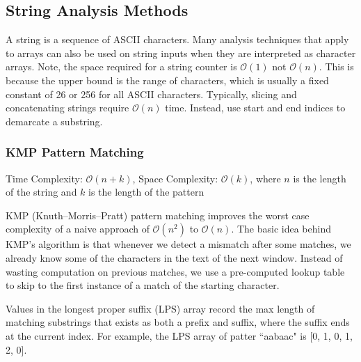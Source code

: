 \documentclass{article}
\newcommand{\bigO}{\mathcal{O}}
\begin{document}
    
    \subsection{String Analysis Methods}
    A string is a sequence of ASCII characters. Many analysis techniques that apply to arrays can also be used on string inputs when they are interpreted as character arrays. Note, the space required for a string counter is $\bigO(1)$ not $\bigO(n)$. This is because the upper bound is the range of characters, which is usually a fixed constant of 26 or 256 for all ASCII characters. Typically, slicing and concatenating strings require $\bigO(n)$ time. Instead, use start and end indices to demarcate a substring.
    
    \subsubsection{KMP Pattern Matching}
    Time Complexity: $\bigO(n + k)$, Space Complexity: $\bigO(k)$, where $n$ is the length of the string and $k$ is the length of the pattern
    
    KMP (Knuth--Morris--Pratt) pattern matching improves the worst case complexity of a naive approach of $\bigO(n^2)$ to $\bigO(n)$. The basic idea behind KMP’s algorithm is that whenever we detect a mismatch after some matches, we already know some of the characters in the text of the next window. Instead of wasting computation on previous matches, we use a pre-computed lookup table to skip to the first instance of a match of the starting character.
    
    Values in the longest proper suffix (LPS) array record the max length of matching substrings that exists as both a prefix and suffix, where the suffix ends at the current index. For example, the LPS array of patter ``aabaac" is [0, 1, 0, 1, 2, 0].
    
\end{document}
